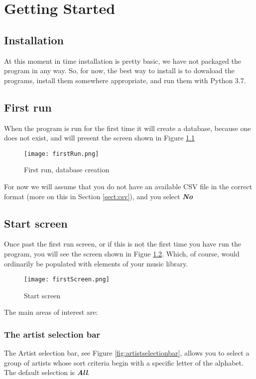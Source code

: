 \chapter{Getting Started}
\section{Installation}
At this moment in time installation is pretty basic, we have not packaged the program in any way.  So, for now, the best way to install is to download the programs, install them somewhere appropriate, and run them with Python 3.7.
 
\section{First run}
When the program is run for the first time it will create a database, because one does not exist, and will present the screen shown in Figure \ref{fig:firstrun}

\begin{figure}
\texttt{[image: firstRun.png]}
\caption{First run, database creation}
\label{fig:firstrun}
\end{figure}

For now we will assume that you do not have an available CSV file in the correct format (more on this in Section \ref{sect:csv}), and you select \textbf{\textit{No}}

\section{Start screen}
Once past the first run screen, or if this is not the first time you have run the program, you will see the screen shown in Figue \ref{fig:firstscreen}. Which, of course, would ordinarily be populated with elements of your music library.
\\

\begin{figure}
\texttt{[image: firstScreen.png]}
\caption{Start screen}
\label{fig:firstscreen}
\end{figure}

The main areas of interest are:

\subsection{The artist selection bar}
The Artist selection bar, see Figure \ref{fig:artistselectionbar}, allows you to select a group of artists whose sort criteria begin with a specific letter of the alphabet.  The default selection is \textbf{\textit{All}}.

